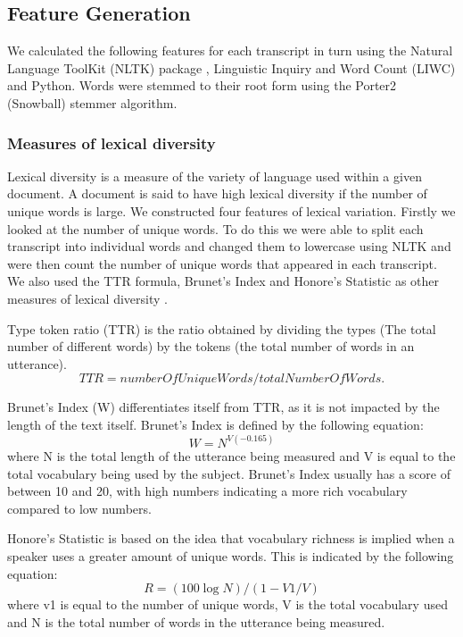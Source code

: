 \documentclass[12pt]{article}
\begin{document}
\subsection{Feature Generation}
We calculated the following features for each transcript in turn using the Natural Language ToolKit (NLTK) package \cite{Bird2009}, Linguistic Inquiry and Word Count (LIWC) \cite{Pennebaker2015} and Python. Words were stemmed to their root form using the Porter2 (Snowball) stemmer algorithm. 
\par 
\subsubsection{Measures of lexical diversity}
Lexical diversity is a measure of the variety of language used within a given document. A document is said to have high lexical diversity if the number of unique words is large. We constructed four features of lexical variation. Firstly we looked at the number of unique words. To do this we were able to split each transcript into individual words and changed them to lowercase using NLTK and were then count the number of unique words that appeared in each transcript. We also used the TTR formula, Brunet's Index and Honore's Statistic as other measures of lexical diversity \cite{Richards1987}. 
\par 
Type token ratio (TTR) is the ratio obtained by dividing the types (The total number of different words) by the tokens (the total number of words in an utterance).
\begin{equation} \label{x1}
TTR = numberOfUniqueWords / totalNumberOfWords.
\end{equation}
\par 
Brunet's Index (W) differentiates itself from TTR, as it is not impacted by the length of the text itself. Brunet's Index is defined by the following equation:
\begin{equation} \label{x2}
W = N^{V(-0.165)}
\end{equation}
where N is the total length of the utterance being measured and V is equal to the total vocabulary being used by the subject. Brunet's Index usually has a score of between 10 and 20, with high numbers indicating a more rich vocabulary compared to low numbers. \newline
\par 
Honore's Statistic is based on the idea that vocabulary richness is implied when a speaker uses a greater amount of unique words. This is indicated by the following equation: 
\begin{equation} \label{x3}
R = (100 \log N) / (1 - V1/V)
\end{equation}
where v1 is equal to the number of unique words, V is the total vocabulary used and N is the total number of words in the utterance being measured.
\end{document}
